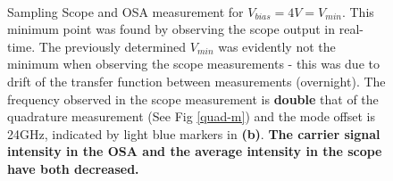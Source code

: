 \documentclass[12pt,a4paper]{report}
\begin{document}
\begin{figure}
    \centering
    \quad
    \\
    \vspace{0.45cm}
    \caption{Sampling Scope and OSA measurement for $V_{bias}=4V=V_{min}$. This minimum point was found by observing the scope output in real-time. The previously determined $V_{min}$ was evidently not the minimum when observing the scope measurements - this was due to drift of the transfer function between measurements (overnight). The frequency observed in the scope measurement is \textbf{double} that of the quadrature measurement (See Fig \ref{quad-m}) and the mode offset is 24GHz, indicated by light blue markers in \textbf{(b)}. \textbf{The carrier signal intensity in the OSA and the average intensity in the scope have both decreased.}}
    \label{min-m}
    \vspace{-12pt}
\end{figure}
\end{document}
